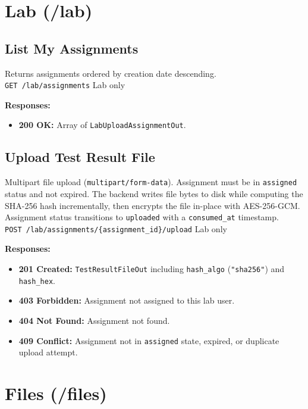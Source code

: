 \documentclass[a4paper,12pt]{report}
\begin{document}
\section{Lab (/lab)}

\subsection{List My Assignments}

Returns assignments ordered by creation date descending. \\
\texttt{GET /lab/assignments} \hfill Lab only

\noindent\textbf{Responses:}
\begin{itemize}
    \item \textbf{200 OK:} Array of \texttt{LabUploadAssignmentOut}.
\end{itemize}

\subsection{Upload Test Result File}

Multipart file upload (\texttt{multipart/form-data}). Assignment must be in \texttt{assigned} status and not expired. The backend writes file bytes to disk while computing the SHA-256 hash incrementally, then encrypts the file in-place with AES-256-GCM. Assignment status transitions to \texttt{uploaded} with a \texttt{consumed\_at} timestamp. \\
\texttt{POST /lab/assignments/\{assignment\_id\}/upload} \hfill Lab only

\noindent\textbf{Responses:}
\begin{itemize}
    \item \textbf{201 Created:} \texttt{TestResultFileOut} including \texttt{hash\_algo} (\texttt{"sha256"}) and \texttt{hash\_hex}.
    \item \textbf{403 Forbidden:} Assignment not assigned to this lab user.
    \item \textbf{404 Not Found:} Assignment not found.
    \item \textbf{409 Conflict:} Assignment not in \texttt{assigned} state, expired, or duplicate upload attempt.
\end{itemize}

\section{Files (/files)}
\end{document}
